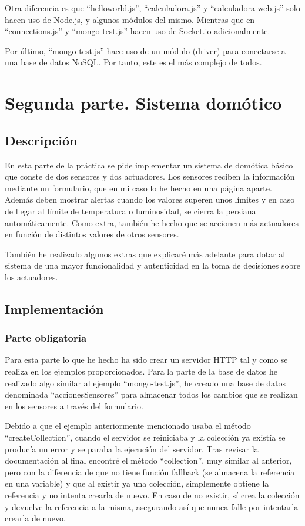 \documentclass{article}
\begin{document}
Otra diferencia es que ``helloworld.js'', ``calculadora.js'' y ``calculadora-web.js'' solo hacen uso de Node.js, y algunos módulos del mismo. Mientras que en ``connections.js'' y ``mongo-test.js'' hacen uso de Socket.io adicionalmente.

Por último, ``mongo-test.js'' hace uso de un módulo (driver) para conectarse a una base de datos NoSQL. Por tanto, este es el más complejo de todos.

\section{Segunda parte. Sistema domótico}
\subsection{Descripción}
En esta parte de la práctica se pide implementar un sistema de domótica básico que conste de dos sensores y dos actuadores. Los sensores reciben la información mediante un formulario, que en mi caso lo he hecho en una página aparte. Además deben mostrar alertas cuando los valores superen unos límites y en caso de llegar al límite de temperatura o luminosidad, se cierra la persiana automáticamente. Como extra, también he hecho que se accionen más actuadores en función de distintos valores de otros sensores.

También he realizado algunos extras que explicaré más adelante para dotar al sistema de una mayor funcionalidad y autenticidad en la toma de decisiones sobre los actuadores.

\subsection{Implementación}
\subsubsection{Parte obligatoria}
Para esta parte lo que he hecho ha sido crear un servidor HTTP tal y como se realiza en los ejemplos proporcionados. Para la parte de la base de datos he realizado algo similar al ejemplo ``mongo-test.js'', he creado una base de datos denominada ``accionesSensores'' para almacenar todos los cambios que se realizan en los sensores a través del formulario.

Debido a que el ejemplo anteriormente mencionado usaba el método ``createCollection'', cuando el servidor se reiniciaba y la colección ya existía se producía un error y se paraba la ejecución del servidor. Tras revisar la documentación al final encontré el método ``collection'', muy similar al anterior, pero con la diferencia de que no tiene función fallback (se almacena la referencia en una variable) y que al existir ya una colección, simplemente obtiene la referencia y no intenta crearla de nuevo. En caso de no existir, sí crea la colección y devuelve la referencia a la misma, asegurando así que nunca falle por intentarla crearla de nuevo.
\end{document}
